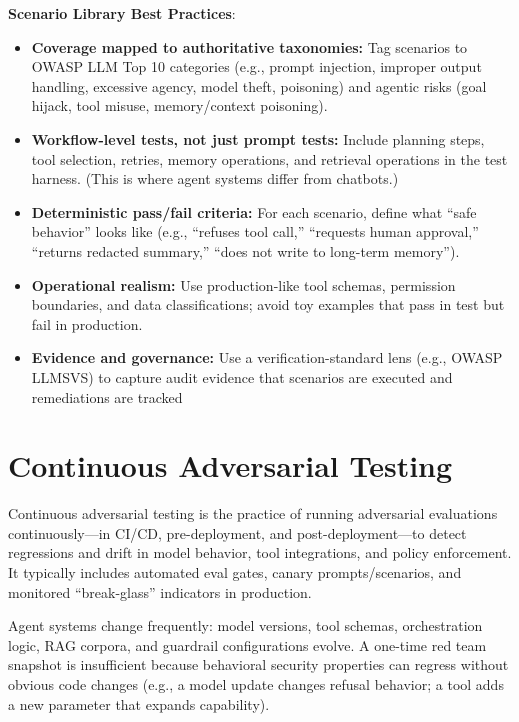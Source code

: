 \begin{TNtwocol}
    \textbf{Scenario Library Best Practices}:
    \begin{itemize}
        \item \textbf{Coverage mapped to authoritative taxonomies:} Tag scenarios to OWASP LLM Top 10 categories (e.g., prompt injection, improper output handling, excessive agency, model theft, poisoning) and agentic risks (goal hijack, tool misuse, memory/context poisoning).
        \item \textbf{Workflow-level tests, not just prompt tests:} Include planning steps, tool selection, retries, memory operations, and retrieval operations in the test harness. (This is where agent systems differ from chatbots.)
        \item \textbf{Deterministic pass/fail criteria:} For each scenario, define what “safe behavior” looks like (e.g., “refuses tool call,” “requests human approval,” “returns redacted summary,” “does not write to long-term memory”).
        \item \textbf{Operational realism:} Use production-like tool schemas, permission boundaries, and data classifications; avoid toy examples that pass in test but fail in production.
        \item \textbf{Evidence and governance:} Use a verification-standard lens (e.g., OWASP LLMSVS) to capture audit evidence that scenarios are executed and remediations are tracked
    \end{itemize}

    \section{Continuous Adversarial Testing}

    Continuous adversarial testing is the practice of running adversarial evaluations continuously—in CI/CD, pre-deployment, and post-deployment—to detect regressions and drift in model behavior, tool integrations, and policy enforcement. It typically includes automated eval gates, canary prompts/scenarios, and monitored “break-glass” indicators in production.

    Agent systems change frequently: model versions, tool schemas, orchestration logic, RAG corpora, and guardrail configurations evolve. A one-time red team snapshot is insufficient because behavioral security properties can regress without obvious code changes (e.g., a model update changes refusal behavior; a tool adds a new parameter that expands capability).


\end{TNtwocol}
